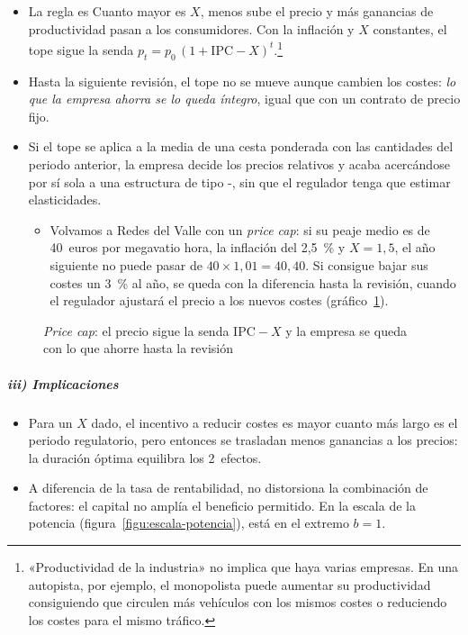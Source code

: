 \documentclass[11pt]{article}
\begin{document}
\begin{itemize}
\item La regla es
  Cuanto mayor es $X$, menos sube el precio y más ganancias de productividad pasan a los consumidores. Con la inflación y $X$ constantes, el tope sigue la senda $p_t=p_0\,(1+\mathrm{IPC}-X)^t$.\footnote{«Productividad de la industria» no implica que haya varias empresas. En una autopista, por ejemplo, el monopolista puede aumentar su productividad consiguiendo que circulen más vehículos con los mismos costes o reduciendo los costes para el mismo tráfico.}
\item Hasta la siguiente revisión, el tope no se mueve aunque cambien los costes: \emph{lo que la empresa ahorra se lo queda íntegro}, igual que con un contrato de precio fijo.
\item Si el tope se aplica a la media de una cesta ponderada con las cantidades del periodo anterior, la empresa decide los precios relativos y acaba acercándose por sí sola a una estructura de tipo -, sin que el regulador tenga que estimar elasticidades\nocite{VogelsangFinsinger1979Regulatory}.
  \begin{itemize}
  \item Volvamos a Redes del Valle con un \emph{price cap}: si su peaje medio es de 40~euros por megavatio hora, la inflación del 2,5~\% y $X=1{,}5$, el año siguiente no puede pasar de $40\times1{,}01=40{,}40$. Si consigue bajar sus costes un 3~\% al año, se queda con la diferencia hasta la revisión, cuando el regulador ajustará el precio a los nuevos costes (gráfico~\ref{fig:price-cap}).
  \end{itemize}
\end{itemize}

\begin{figure}[H]
\centering
\caption{\emph{Price cap}: el precio sigue la senda $\mathrm{IPC}-X$ y la empresa se queda con lo que ahorre hasta la revisión}\label{fig:price-cap}
\end{figure}

\subparagraph{iii) Implicaciones}

\begin{itemize}
\item Para un $X$ dado, el incentivo a reducir costes es mayor cuanto más largo es el periodo regulatorio, pero entonces se trasladan menos ganancias a los precios: la duración óptima equilibra los 2~efectos.
\item A diferencia de la tasa de rentabilidad, no distorsiona la combinación de factores: el capital no amplía el beneficio permitido. En la escala de la potencia (figura~\ref{figu:escala-potencia}), está en el extremo $b=1$.
\end{itemize}
\end{document}
